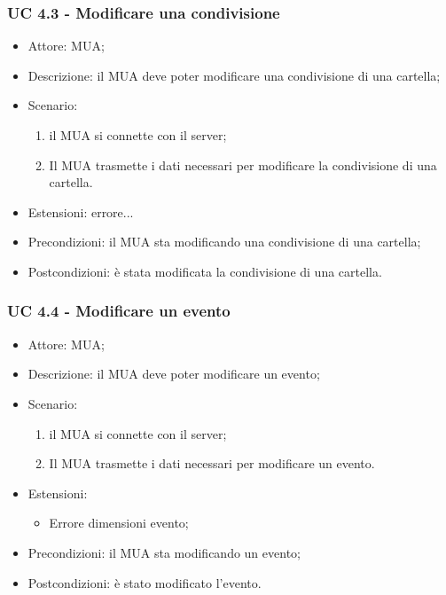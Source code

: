     \subsubsection{UC 4.3 - Modificare una condivisione} \label{sec: UC 4.3}
    \begin{itemize}
        \item Attore: MUA;
        \item Descrizione: il MUA deve poter modificare una condivisione di una cartella;
        \item Scenario:
        \begin{enumerate}
        \item il MUA si connette con il server;
        \item Il MUA trasmette i dati necessari per modificare la condivisione di una cartella.
        \end{enumerate}
        \item Estensioni: errore...
        \item Precondizioni: il MUA sta modificando una condivisione di una cartella;
        \item Postcondizioni: è stata modificata la condivisione di una cartella.
    \end{itemize}

    \subsubsection{UC 4.4 - Modificare un evento} \label{sec: UC 4.4}
    \begin{itemize}
        \item Attore: MUA;
        \item Descrizione: il MUA deve poter modificare un evento;
        \item Scenario:
        \begin{enumerate}
        \item il MUA si connette con il server;
        \item Il MUA trasmette i dati necessari per modificare un evento.
        \end{enumerate}
        \item Estensioni: 
        \begin{itemize}
            \item Errore dimensioni evento;
        \end{itemize}
        \item Precondizioni: il MUA sta modificando un evento;
        \item Postcondizioni: è stato modificato l'evento.
    \end{itemize}

